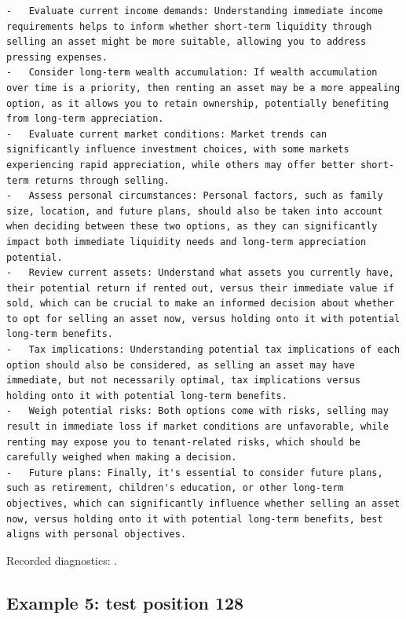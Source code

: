 \begin{Verbatim}
-   Evaluate current income demands: Understanding immediate income requirements helps to inform whether short-term liquidity through selling an asset might be more suitable, allowing you to address pressing expenses.
-   Consider long-term wealth accumulation: If wealth accumulation over time is a priority, then renting an asset may be a more appealing option, as it allows you to retain ownership, potentially benefiting from long-term appreciation.
-   Evaluate current market conditions: Market trends can significantly influence investment choices, with some markets experiencing rapid appreciation, while others may offer better short-term returns through selling.
-   Assess personal circumstances: Personal factors, such as family size, location, and future plans, should also be taken into account when deciding between these two options, as they can significantly impact both immediate liquidity needs and long-term appreciation potential.
-   Review current assets: Understand what assets you currently have, their potential return if rented out, versus their immediate value if sold, which can be crucial to make an informed decision about whether to opt for selling an asset now, versus holding onto it with potential long-term benefits.
-   Tax implications: Understanding potential tax implications of each option should also be considered, as selling an asset may have immediate, but not necessarily optimal, tax implications versus holding onto it with potential long-term benefits.
-   Weigh potential risks: Both options come with risks, selling may result in immediate loss if market conditions are unfavorable, while renting may expose you to tenant-related risks, which should be carefully weighed when making a decision.
-   Future plans: Finally, it's essential to consider future plans, such as retirement, children's education, or other long-term objectives, which can significantly influence whether selling an asset now, versus holding onto it with potential long-term benefits, best aligns with personal objectives.
\end{Verbatim}

Recorded diagnostics:
\texttt{}.

\subsection{Example 5: test position
128}\label{record-docs-watermarking-qualitative-text-latent-bira-md-example-5-test-position-128}


